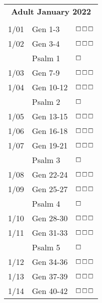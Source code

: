 \documentclass[10pt,landscape,letterpaper]{article}
\begin{document}

\begin{multicols}{5}
\small

\begin{tabular}
{p{0.15in}p{0.7in}p{0.5in}}
\multicolumn{3}{c}{\textbf{Adult January 2022}} \\
& & \\
1/01 & Gen 1-3 & $\boxempty$$\boxempty$$\boxempty$ \\
1/02 & Gen 3-4 & $\boxempty$$\boxempty$$\boxempty$ \\
 & \textcolor[rgb]{0.98,0.00,0.00}{Psalm 1} & \textcolor[rgb]{1.00,0.00,0.00}{$\boxempty$} \\
1/03 & Gen 7-9 & $\boxempty$$\boxempty$$\boxempty$ \\
1/04 & Gen 10-12 & $\boxempty$$\boxempty$$\boxempty$ \\
 & \textcolor[rgb]{0.98,0.00,0.00}{Psalm 2} & \textcolor[rgb]{1.00,0.00,0.00}{$\boxempty$} \\
1/05 & Gen 13-15 & $\boxempty$$\boxempty$$\boxempty$ \\
1/06 & Gen 16-18 & $\boxempty$$\boxempty$$\boxempty$ \\
1/07 & Gen 19-21 & $\boxempty$$\boxempty$$\boxempty$ \\
 & \textcolor[rgb]{0.98,0.00,0.00}{Psalm 3} & \textcolor[rgb]{1.00,0.00,0.00}{$\boxempty$} \\
1/08 & Gen 22-24 & $\boxempty$$\boxempty$$\boxempty$ \\
1/09 & Gen 25-27 & $\boxempty$$\boxempty$$\boxempty$ \\
 & \textcolor[rgb]{0.98,0.00,0.00}{Psalm 4} & \textcolor[rgb]{1.00,0.00,0.00}{$\boxempty$} \\
1/10 & Gen 28-30 & $\boxempty$$\boxempty$$\boxempty$ \\
1/11 & Gen 31-33 & $\boxempty$$\boxempty$$\boxempty$ \\
 & \textcolor[rgb]{0.98,0.00,0.00}{Psalm 5} & \textcolor[rgb]{1.00,0.00,0.00}{$\boxempty$} \\
1/12 & Gen 34-36 & $\boxempty$$\boxempty$$\boxempty$ \\
1/13 & Gen 37-39 & $\boxempty$$\boxempty$$\boxempty$ \\
1/14 & Gen 40-42 & $\boxempty$$\boxempty$$\boxempty$ \\

\end{tabular}
\end{multicols}
\end{document}
